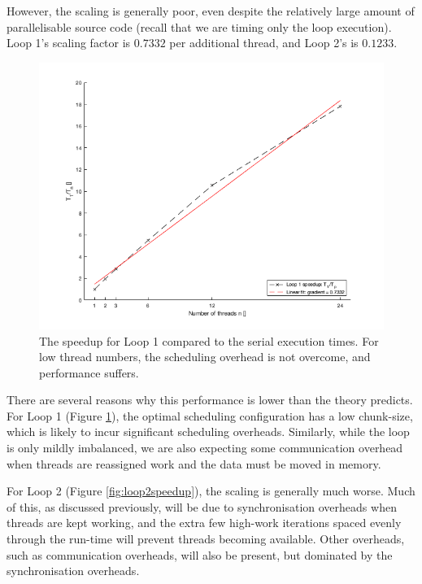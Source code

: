 \documentclass{article} %
\begin{document}
However, the scaling is generally poor, even despite the relatively large amount of parallelisable source code (recall that we are timing only the loop execution).
Loop 1's scaling factor is $0.7332$ per additional thread, and Loop 2's is $0.1233$. 

\begin{figure}
    \centering
    \includegraphics[height=.35\textheight]{part1_plots/loop1_speedup.png}
    \caption{The speedup for Loop 1 compared to the serial execution times. For low thread numbers, the scheduling overhead is not overcome, and performance suffers.}
    \label{fig:loop1speedup}
\end{figure}

There are several reasons why this performance is lower than the theory predicts. 
For Loop 1 (Figure \ref{fig:loop1speedup}), the optimal scheduling configuration has a low chunk-size, which is likely to incur significant scheduling overheads.
Similarly, while the loop is only mildly imbalanced, we are also expecting some communication overhead when threads are reassigned work and the data must be moved in memory.

For Loop 2 (Figure \ref{fig:loop2speedup}), the scaling is generally much worse.
Much of this, as discussed previously, will be due to synchronisation overheads when threads are kept working, and the extra few high-work iterations spaced evenly through the run-time will prevent threads becoming available.
Other overheads, such as communication overheads, will also be present, but dominated by the synchronisation overheads.
\end{document}
